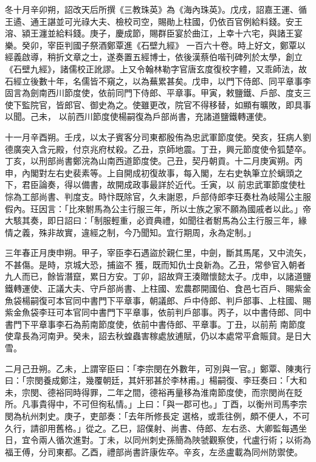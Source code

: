 \begin{pinyinscope}
 冬十月辛卯朔，詔改天后所撰《三教珠英》為《海內珠英》。戊戌，詔嘉王運、循王遹、通王諶並可光祿大夫、檢校司空，賜勛上柱國，仍依百官例給料錢。安王溶、潁王瀍並給料錢。庚子，慶成節，賜群臣宴於曲江，上幸十六宅，與諸王宴樂。癸卯，宰臣判國子祭酒鄭覃進《石壁九經》
 一百六十卷。時上好文，鄭覃以經義啟導，稍折文章之士，遂奏置五經博士，依後漢蔡伯喈刊碑列於太學，創立《石壁九經》，諸儒校正訛謬。上又令翰林勒字官唐玄度復校字體，又乖師法，故石經立後數十年，名儒皆不窺之，以為蕪累甚矣。戊申，以門下侍郎、同平章事李固言為劍南西川節度使，依前同門下侍郎、平章事。甲寅，敕鹽鐵、戶部、度支三使下監院官，皆郎官、御史為之。使雖更改，院官不得移替，如顯有曠敗，即具事以聞。己未，
 以前西川節度使楊嗣復為戶部尚書，充諸道鹽鐵轉運使。



 十一月辛酉朔。壬戌，以太子賓客分司東都殷侑為忠武軍節度使。癸亥，狂病人劉德廣突入含元殿，付京兆府杖殺。乙丑，京師地震。丁丑，興元節度使令狐楚卒。丁亥，以刑部尚書鄭浣為山南西道節度使。己丑，契丹朝貢。十二月庚寅朔。丙申，內閣對左右史裴素等。上自開成初復故事，每入閣，左右史執筆立於螭頭之下，君臣論奏，得以備書，故開成政事最詳於近代。壬寅，以
 前忠武軍節度使杜悰為工部尚書、判度支。時忭既除官，久未謝恩，戶部侍郎李玨奏杜為岐陽公主服假內。玨因言：「比來駙馬為公主行服三年，所以士族之家不願為國戚者以此。」帝大駭其奏，即日詔曰：「制服輕重，必資典禮，如聞往者駙馬為公主行服三年，緣情之義，殊非故實，違經之制，今乃聞知。宜行期周，永為定制。」



 三年春正月庚申朔。甲子，宰臣李石遇盜於親仁里，中劍，斷其馬尾，又中流矢，不甚傷。是時，京城大恐，捕盜不
 獲，既而知仇士良新為。乙丑，常參官入朝者九人而已，餘皆潛竄，累日方安。丁卯，詔故齊王湊贈懷懿太子。戊申，以諸道鹽鐵轉運使、正議大夫、守戶部尚書、上柱國、宏農郡開國伯、食邑七百戶、賜紫金魚袋楊嗣復可本官同中書門下平章事，朝議郎、戶中侍郎、判戶部事、上柱國、賜紫金魚袋李玨可本官同中書門下平章事，依前判戶部事。丙子，以中書侍郎、同中書門下平章事李石為荊南節度使，依前中書侍郎、平章事。丁丑，以前荊
 南節度使韋長為河南尹。癸未，詔去秋蝗蟲害稼處放逋賦，仍以本處常平倉賑貸。是日大雪。



 二月己丑朔。乙未，上謂宰臣曰：「李宗閔在外數年，可別與一官。」鄭覃、陳夷行曰：「宗閔養成鄭注，幾覆朝廷，其奸邪甚於李林甫。」楊嗣復、李玨奏曰：「大和未，宗閔、德裕同時得罪，二年之間，德裕再量移為淮南節度使，而宗閔尚在貶所。凡事貴得中，不可但徇私情。」上曰：「與一郡可也。」丁酉，以衡州司馬李宗閔為杭州刺史。庚子，吏部奏：「去年所修長定
 選格，或乖往例，頗不便人，不可久行，請卻用舊格。」從之。乙巳，詔僕射、尚書、侍郎、左右丞、大卿監每遇坐日，宜令兩人循次進對。丁未，以同州刺史孫簡為陜虢觀察使，代盧行術；以術為福王傅，分司東都。乙酉，禮部尚書許康佐卒。辛亥，左丞盧載為同州防禦使。




\end{pinyinscope}
